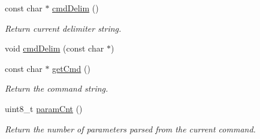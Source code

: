\begin{DoxyCompactItemize}
const char $\ast$ \hyperlink{class_cmd_processor_a4dc02963de9f314346c028c9ea0c02ae}{cmdDelim} ()
\begin{DoxyCompactList}\small\item\em Return current delimiter string. \item\end{DoxyCompactList}\item 
void \hyperlink{class_cmd_processor_a7b4a871cb83f57986fdea9423d6197cf}{cmdDelim} (const char $\ast$)
\item 
const char $\ast$ \hyperlink{class_cmd_processor_ad50f4ad388976a233cbb28877f87ed7e}{getCmd} ()
\begin{DoxyCompactList}\small\item\em Return the command string. \item\end{DoxyCompactList}\item 
uint8\_\-t \hyperlink{class_cmd_processor_acdf54848c152fe7d2f43b51b1e2e366d}{paramCnt} ()
\begin{DoxyCompactList}\small\item\em Return the number of parameters parsed from the current command. \item\end{DoxyCompactList}\end{DoxyCompactItemize}
